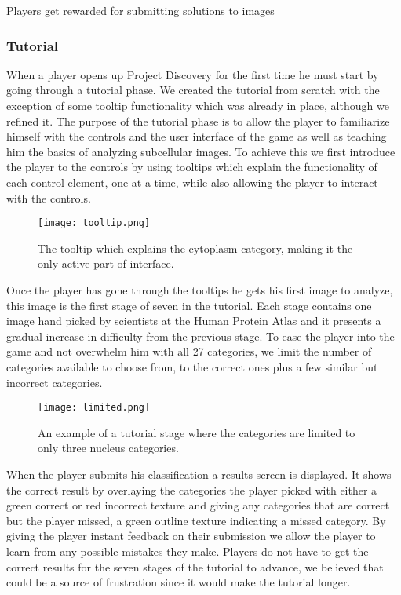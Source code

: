 	Players get rewarded for submitting solutions to images   

	\subsubsection{Tutorial}
		When a player opens up Project Discovery for the first time he must start by going through a tutorial phase. We created the tutorial from scratch with the exception of some tooltip functionality which was already in place, although we refined it. The purpose of the tutorial phase is to allow the player to familiarize himself with the controls and the user interface of the game as well as teaching him the basics of analyzing subcellular images. To achieve this we first introduce the player to the controls by using tooltips which explain the functionality of each control element, one at a time, while also allowing the player to interact with the controls. 

		\begin{figure}[H]
		  \centering
		  \graphicspath{ {./graphics/} }
		  \centerline{\texttt{[image: tooltip.png]}}
		  \caption{\label{fig:tooltip}The tooltip which explains the cytoplasm category, making it the only active part of interface.}
		\end{figure}

		Once the player has gone through the tooltips he gets his first image to analyze, this image is the first stage of seven in the tutorial. Each stage contains one image hand picked by scientists at the Human Protein Atlas and it presents a gradual increase in difficulty from the previous stage. To ease the player into the game and not overwhelm him with all 27 categories, we limit the number of categories available to choose from, to the correct ones plus a few similar but incorrect categories.

		\begin{figure}[H]
		  \centering
		  \graphicspath{ {./graphics/} }
		  \centerline{\texttt{[image: limited.png]}}
		  \caption{\label{fig:limited}An example of a tutorial stage where the categories are limited to only three nucleus categories.}
		\end{figure}

		When the player submits his classification a results screen is displayed. It shows the correct result by overlaying the categories the player picked with either a green correct or red incorrect texture and giving any categories that are correct but the player missed, a green outline texture indicating a missed category. By giving the player instant feedback on their submission we allow the player to learn from any possible mistakes they make. Players do not have to get the correct results for the seven stages of the tutorial to advance, we believed that could be a source of frustration since it would make the tutorial longer. 

